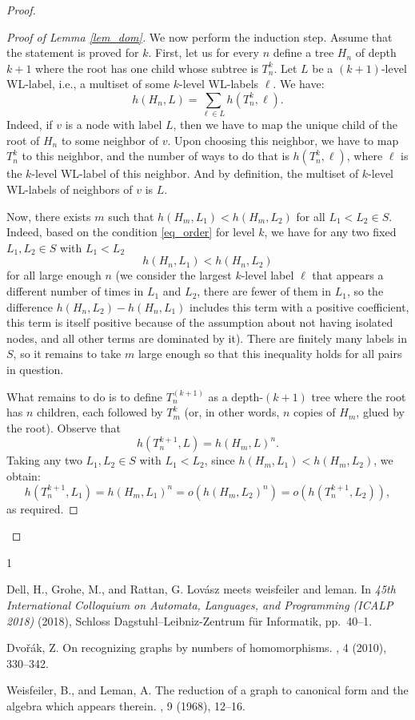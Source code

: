 \documentclass{article}
\begin{document}
\begin{proof}
\begin{proof}[Proof of Lemma \ref{lem_dom}]
We now perform the induction step. Assume that the statement is proved for $k$. First, let us for every $n$ define a tree $H_n$ of depth $k + 1$  where the root has one child whose subtree is $T_n^k$. Let $L$ be a $(k + 1)$-level WL-label, i.e., a multiset of some $k$-level WL-labels $\ell$. We have:
\[h(H_n, L) =  \sum\limits_{\ell\in L} h(T_n^k, \ell).\]
Indeed, if $v$ is a node with label $L$, then we have to map the unique child of the root of $H_n$ to some neighbor of $v$. Upon choosing this neighbor, we have to map $T_n^k$ to this neighbor, and the number of ways to do that is $h(T_n^k, \ell)$, where $\ell$ is the $k$-level WL-label of this neighbor. And by definition, the multiset of $k$-level WL-labels of neighbors of $v$ is $L$. 


 Now, there exists $m$ such that $h(H_m, L_1) < h(H_m, L_2)$ for all $L_1 < L_2 \in S$. Indeed, based on the condition \eqref{eq_order} for level $k$, we have for any two fixed $L_1, L_2 \in S$ with $L_1 < L_2$ 
 \[h(H_n, L_1) < h(H_n, L_2)\]
 for all large enough $n$ (we consider the largest $k$-level label $\ell$ that appears a different number of times in $L_1$ and $L_2$, there are fewer of them in $L_1$, so the difference  $h(H_n, L_2) - h(H_n, L_1)$ includes this term with a positive coefficient, this term is itself positive because of the assumption about not having isolated nodes, and all other terms are dominated by it). There are finitely many labels in $S$, so it remains to take $m$ large enough so that this inequality holds for all pairs in question.


 What remains to do is to define $T_n^{(k+1)}$ as a depth-$(k+1)$ tree where the root has $n$ children, each followed by $T_m^k$ (or, in other words, $n$ copies of $H_m$, glued by the root). Observe that 
 \[h(T_n^{k+1}, L) = h(H_m, L)^n.\]
Taking any two $L_1, L_2 \in S$ with $L_1 < L_2$, since  $h(H_m, L_1) < h(H_m, L_2)$, we obtain:
\[h(T_n^{k+1}, L_1) = h(H_m, L_1)^n = o( h(H_m, L_2)^n) = o(h(T_n^{k+1}, L_2)),\]
as required.
    \end{proof}
\end{proof}


\begin{thebibliography}{1}

{\sc Dell, H., Grohe, M., and Rattan, G.}
\newblock Lov{\'a}sz meets weisfeiler and leman.
\newblock In {\em 45th International Colloquium on Automata, Languages, and
  Programming (ICALP 2018)\/} (2018), Schloss Dagstuhl--Leibniz-Zentrum f{\"u}r
  Informatik, pp.~40--1.

{\sc Dvo{\v{r}}{\'a}k, Z.}
\newblock On recognizing graphs by numbers of homomorphisms.
, 4 (2010), 330--342.

{\sc Weisfeiler, B., and Leman, A.}
\newblock The reduction of a graph to canonical form and the algebra which
  appears therein.
, 9 (1968), 12--16.

\end{thebibliography}
\end{document}
